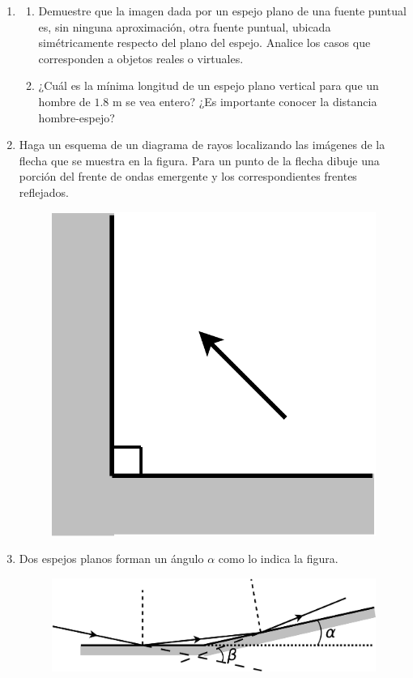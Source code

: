 \documentclass[11pt,spanish,a4paper]{article}
\begin{document}
\begin{enumerate}
\item 
\begin{enumerate}
\item Demuestre que la imagen dada por un espejo plano de una fuente puntual
es, sin ninguna aproximación, otra fuente puntual, ubicada simétricamente
respecto del plano del espejo. Analice los casos que corresponden
a objetos reales o virtuales.
\item ¿Cuál es la mínima longitud de un espejo plano vertical para que un
hombre de $1.8$ m se vea entero? ¿Es importante conocer la distancia
hombre-espejo? 
\end{enumerate}


\item Haga un esquema de un diagrama de rayos localizando las imágenes de
la flecha que se muestra en la figura. Para un punto de la flecha
dibuje una porción del frente de ondas emergente y los correspondientes
frentes reflejados.
\begin{figure}[H]
\centering{}\includegraphics[clip,scale=0.25]{ej3-11}
\end{figure}



\item Dos espejos planos forman un ángulo $\alpha$ como lo indica la figura.
\begin{figure}[H]
\centering{}\includegraphics[clip,scale=0.25]{ej3-12}
\end{figure}



\end{enumerate}
\end{document}

